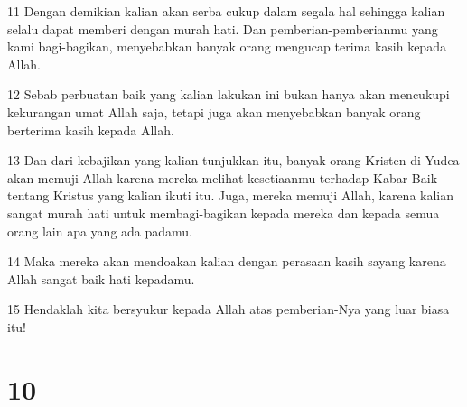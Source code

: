 \par 11 Dengan demikian kalian akan serba cukup dalam segala hal sehingga kalian selalu dapat memberi dengan murah hati. Dan pemberian-pemberianmu yang kami bagi-bagikan, menyebabkan banyak orang mengucap terima kasih kepada Allah.
\par 12 Sebab perbuatan baik yang kalian lakukan ini bukan hanya akan mencukupi kekurangan umat Allah saja, tetapi juga akan menyebabkan banyak orang berterima kasih kepada Allah.
\par 13 Dan dari kebajikan yang kalian tunjukkan itu, banyak orang Kristen di Yudea akan memuji Allah karena mereka melihat kesetiaanmu terhadap Kabar Baik tentang Kristus yang kalian ikuti itu. Juga, mereka memuji Allah, karena kalian sangat murah hati untuk membagi-bagikan kepada mereka dan kepada semua orang lain apa yang ada padamu.
\par 14 Maka mereka akan mendoakan kalian dengan perasaan kasih sayang karena Allah sangat baik hati kepadamu.
\par 15 Hendaklah kita bersyukur kepada Allah atas pemberian-Nya yang luar biasa itu!

\chapter{10}

